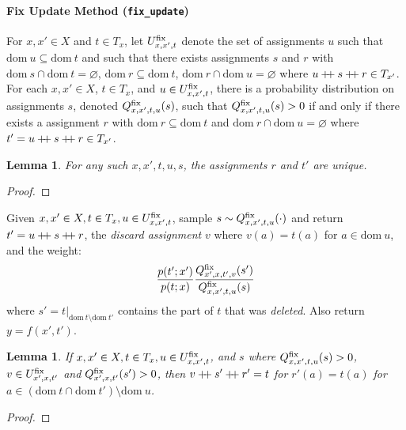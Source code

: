 \documentclass{article}
\newtheorem{lemma}[theorem]{Lemma}
\newcommand{\code}[1]{\texttt{\small{\textbf{#1}}}}
\newcommand\doubleplus{\mathbin{+\mkern-5mu+}}
\newcommand{\concat}[0]{\doubleplus}
\newcommand{\dom}[1]{\mbox{dom}{~#1}}
\newcommand{\fix}[0]{\mbox{\scriptsize fix}}
\begin{document}

\paragraph{Fix Update Method (\code{fix\_update})}
For $x, x' \in X$ and $t \in T_x$, let $U^{\fix}_{x,x',t}$ denote the set of assignments $u$ such that $\dom{u} \subseteq \dom{t}$ and such that there exists assignments $s$ and $r$ with $\dom{s} \cap \dom{t} = \varnothing$, $\dom{r} \subseteq \dom{t}$, $\dom{r} \cap \dom{u} = \varnothing$ where $u \concat s \concat r \in T_{x'}$.
For each $x, x' \in X$, $t \in T_x$, and $u \in U^{\fix}_{x,x',t}$, there is a probability distribution on assignments $s$, denoted $Q^{\fix}_{x,x',t,u}(s)$, such that $Q^{\fix}_{x,x',t,u}(s) > 0$ if and only if there exists a assignment $r$ with $\dom{r} \subseteq \dom{t}$ and $\dom{r} \cap \dom{u} = \varnothing$ where $t' = u \concat s \concat r \in T_{x'}$.

\begin{lemma} \label{lemma:fix-update-unique}
For any such $x, x', t, u, s$, the assignments $r$ and $t'$ are unique.
\end{lemma}
\begin{proof}
\end{proof}

Given $x, x' \in X, t \in T_x, u \in U^{\fix}_{x,x',t}$, sample $s \sim Q^{\fix}_{x,x',t,u}(\cdot)$ and return $t' = u \concat s \concat r$, the \emph{discard assignment} $v$ where $v(a) = t(a)$ for $a \in \dom{u}$, and the weight:
\[
\frac{p(t'; x')}{p(t; x)} \frac{Q^{\fix}_{x',x,t',v}(s')}{Q^{\fix}_{x,x',t,u}(s)}
\]
where $s' = t|_{\dom{t} \setminus \dom{t'}}$ contains the part of $t$ that was \emph{deleted}.
Also return $y = f(x', t')$.

\begin{lemma} \label{lemma:fix-update-reverse}
If $x, x' \in X, t \in T_x, u \in U^{\fix}_{x, x', t}$, and $s$ where $Q^{\fix}_{x,x',t,u}(s) > 0$, $v \in U^{\fix}_{x',x,t'}$ and $Q^{\fix}_{x',x,t'}(s') > 0$, then $v \concat s' \concat r' = t$ for $r'(a) = t(a)$ for $a \in (\dom{t} \cap \dom{t'}) \setminus \dom{u}$.
\end{lemma}
\begin{proof}
\end{proof}
\end{document}
